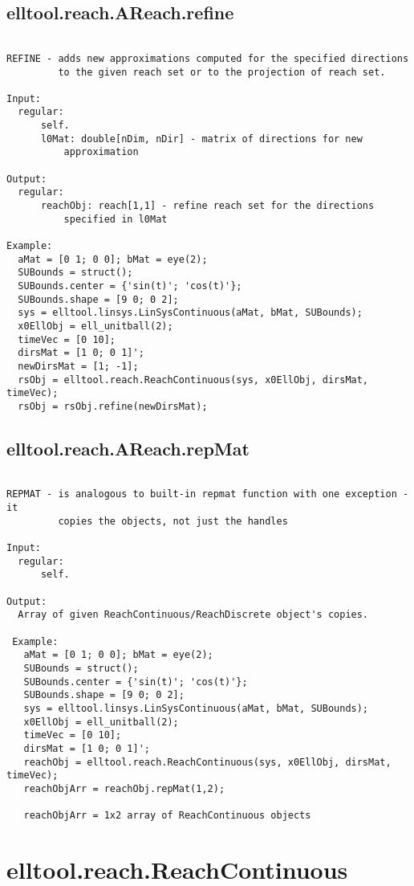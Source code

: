 \subsection{\texorpdfstring{elltool.reach.AReach.refine}{refine}}\label{method:elltool.reach.AReach.refine}
\begin{verbatim}

REFINE - adds new approximations computed for the specified directions
         to the given reach set or to the projection of reach set.

Input:
  regular:
      self.
      l0Mat: double[nDim, nDir] - matrix of directions for new
          approximation

Output:
  regular:
      reachObj: reach[1,1] - refine reach set for the directions
          specified in l0Mat

Example:
  aMat = [0 1; 0 0]; bMat = eye(2);
  SUBounds = struct();
  SUBounds.center = {'sin(t)'; 'cos(t)'};
  SUBounds.shape = [9 0; 0 2];
  sys = elltool.linsys.LinSysContinuous(aMat, bMat, SUBounds);
  x0EllObj = ell_unitball(2);
  timeVec = [0 10];
  dirsMat = [1 0; 0 1]';
  newDirsMat = [1; -1];
  rsObj = elltool.reach.ReachContinuous(sys, x0EllObj, dirsMat, timeVec);
  rsObj = rsObj.refine(newDirsMat);
\end{verbatim}
\subsection{\texorpdfstring{elltool.reach.AReach.repMat}{repMat}}\label{method:elltool.reach.AReach.repMat}
\begin{verbatim}

REPMAT - is analogous to built-in repmat function with one exception - it
         copies the objects, not just the handles

Input:
  regular:
      self.

Output:
  Array of given ReachContinuous/ReachDiscrete object's copies.

 Example:
   aMat = [0 1; 0 0]; bMat = eye(2);
   SUBounds = struct();
   SUBounds.center = {'sin(t)'; 'cos(t)'};
   SUBounds.shape = [9 0; 0 2];
   sys = elltool.linsys.LinSysContinuous(aMat, bMat, SUBounds);
   x0EllObj = ell_unitball(2);
   timeVec = [0 10];
   dirsMat = [1 0; 0 1]';
   reachObj = elltool.reach.ReachContinuous(sys, x0EllObj, dirsMat, timeVec);
   reachObjArr = reachObj.repMat(1,2);

   reachObjArr = 1x2 array of ReachContinuous objects
\end{verbatim}
\section{elltool.reach.ReachContinuous}\label{secClassDescr:elltool.reach.ReachContinuous}
